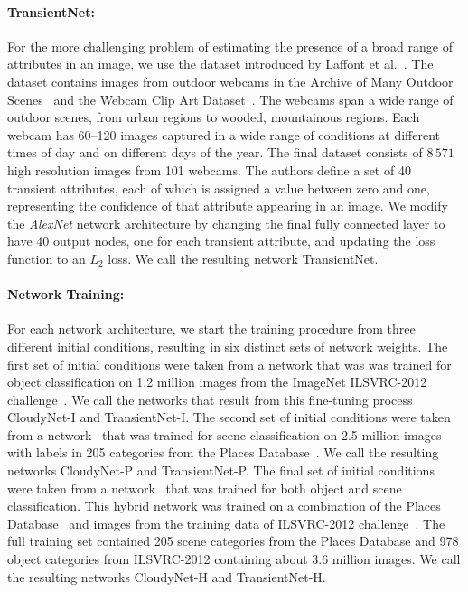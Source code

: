 \documentclass[10pt,twocolumn,letterpaper]{article}
\begin{document}
\paragraph{TransientNet:} For the more challenging problem of estimating the
presence of a broad range of attributes in an image, we use the dataset
introduced by Laffont et al.~\cite{Laffont14}.  The dataset contains images
from outdoor webcams in the Archive of Many Outdoor Scenes~\cite{jacobs07amos}
and the Webcam Clip Art Dataset~\cite{lalondesig09}.  The webcams span a wide
range of outdoor scenes, from urban regions to wooded, mountainous regions.
Each webcam has 60--120 images captured in a wide range of conditions at
different times of day and on different days of the year.  The final dataset
consists of $8\,571$ high resolution images from 101 webcams.  The authors
define a set of 40 transient attributes, each of which is assigned a value
between zero and one, representing the confidence of that attribute appearing
in an image. We modify the \emph{AlexNet} network architecture by changing the final
fully connected layer to have 40 output nodes, one for each transient
attribute, and updating the loss function to an $L_2$ loss. We call the
resulting network TransientNet. 

\vspace{-1em}
\paragraph{Network Training:} For each network architecture, we start the training procedure from three different initial conditions,
resulting in six distinct sets of network weights. The first set of initial
conditions were taken from a network that was was trained for object
classification on 1.2 million images from the ImageNet ILSVRC-2012
challenge~\cite{ILSVRCarxiv14}.  We call the networks that result from this
fine-tuning process CloudyNet-I and TransientNet-I.  The second set of initial
conditions were taken from a network~\cite{zhou2014places} that was trained for
scene classification on 2.5 million images with labels in 205 categories from
the Places Database~\cite{zhou2014places}. We call the resulting networks
CloudyNet-P and TransientNet-P.  The final set of initial conditions were taken
from a network~\cite{zhou2014places} that was trained for both object and scene
classification.  This hybrid network was trained on a combination of the Places
Database~\cite{zhou2014places} and images from the training data of ILSVRC-2012
challenge~\cite{ILSVRCarxiv14}.  The full training set contained 205 scene
categories from the Places Database and 978 object categories from ILSVRC-2012
containing about 3.6 million images.  We call the resulting networks CloudyNet-H
and TransientNet-H.
\end{document}
